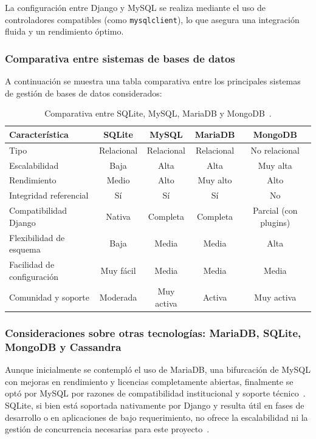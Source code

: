 La configuración entre Django y MySQL se realiza mediante el uso de controladores compatibles (como \texttt{mysqlclient}), lo que asegura una integración fluida y un rendimiento óptimo.

\subsubsection{Comparativa entre sistemas de bases de datos}

A continuación se muestra una tabla comparativa entre los principales sistemas de gestión de bases de datos considerados:

\begin{table}[H]
    \centering
    \begin{tabular}{|l|c|c|c|c|}
        \hline
        \textbf{Característica} & \textbf{SQLite} & \textbf{MySQL} & \textbf{MariaDB} & \textbf{MongoDB} \\ \hline
        Tipo & Relacional & Relacional & Relacional & No relacional \\ \hline
        Escalabilidad & Baja & Alta & Alta & Muy alta \\ \hline
        Rendimiento & Medio & Alto & Muy alto & Alto \\ \hline
        Integridad referencial & Sí & Sí & Sí & No \\ \hline
        Compatibilidad Django & Nativa & Completa & Completa & Parcial (con plugins) \\ \hline
        Flexibilidad de esquema & Baja & Media & Media & Alta \\ \hline
        Facilidad de configuración & Muy fácil & Media & Media & Media \\ \hline
        Comunidad y soporte & Moderada & Muy activa & Activa & Muy activa \\ \hline
    \end{tabular}
    \caption{Comparativa entre SQLite, MySQL, MariaDB y MongoDB~\cite{elmasri2017, mariadb2023, mongodb2024}.}
    \label{tabla:comparativa_bases_datos}
\end{table}

\subsubsection{Consideraciones sobre otras tecnologías: MariaDB, SQLite, MongoDB y Cassandra}

Aunque inicialmente se contempló el uso de MariaDB, una bifurcación de MySQL con mejoras en rendimiento y licencias completamente abiertas, finalmente se optó por MySQL por razones de compatibilidad institucional y soporte técnico~\cite{mariadb2023}. SQLite, si bien está soportada nativamente por Django y resulta útil en fases de desarrollo o en aplicaciones de bajo requerimiento, no ofrece la escalabilidad ni la gestión de concurrencia necesarias para este proyecto~\cite{django_sqlite2024}. 

